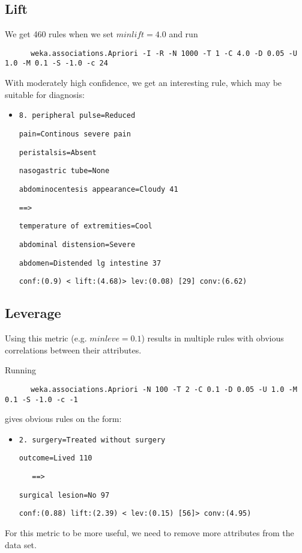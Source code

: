 \subsection{Lift}
We get 460 rules when we set $minlift = 4.0$ and run
\begin{verbatim}
	  weka.associations.Apriori -I -R -N 1000 -T 1 -C 4.0 -D 0.05 -U 1.0 -M 0.1 -S -1.0 -c 24
\end{verbatim}
With moderately high confidence, we get an interesting rule, which may be suitable for diagnosis:
\begin{itemize}
\item   \verb|8. peripheral pulse=Reduced|

\verb|pain=Continous severe pain| 

\verb|peristalsis=Absent| 

\verb|nasogastric tube=None| 

\verb|abdominocentesis appearance=Cloudy 41 |


\verb|==>| 


\verb|temperature of extremities=Cool| 

\verb|abdominal distension=Severe |

\verb|abdomen=Distended lg intestine 37 | 
  
\verb|conf:(0.9) < lift:(4.68)> lev:(0.08) [29] conv:(6.62)|

\end{itemize}



\subsection{Leverage}
Using this metric (e.g. $minleve = 0.1$) results in multiple rules with obvious correlations between their attributes.

\noindent
Running
\begin{verbatim}
	  weka.associations.Apriori -N 100 -T 2 -C 0.1 -D 0.05 -U 1.0 -M 0.1 -S -1.0 -c -1
\end{verbatim} 

\noindent
gives obvious rules on the form:
\begin{itemize}
\item \verb|2. surgery=Treated without surgery| 

\verb|outcome=Lived 110|


\verb|   ==>|
 
\verb|surgical lesion=No 97|

\verb|conf:(0.88) lift:(2.39) < lev:(0.15) [56]> conv:(4.95)|
\end{itemize}
For this metric to be more useful, we need to remove more attributes from the data set.


